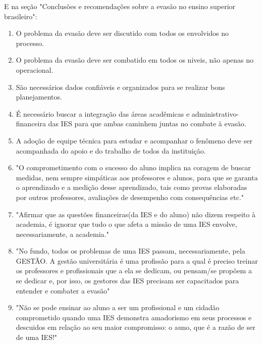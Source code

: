 \documentclass{report}
\begin{document}
E na seção "Conclusões e recomendações sobre a evasão no ensino superior brasileiro":

\begin{enumerate}

\item O problema da evasão deve ser discutido com todos os envolvidos no processo.

\item O problema da evasão deve ser combatido em todos os niveis, não apenas no operacional.

\item São necessários dados confiáveis e organizados para se realizar bons planejamentos.

\item É necessário buscar a integração das áreas acadêmicas e administrativo-financeira das IES para que ambas caminhem juntas no combate à evasão.

\item A adoção de equipe técnica para estudar e acompanhar o fenômeno deve ser acompanhada do apoio e do trabalho de todos da instituição.

\item "O comprometimento com o sucesso do aluno implica na coragem de buscar medidas, nem sempre simpáticas aos professores e alunos, para que se garanta o aprendizado e a medição desse aprendizado, tais como provas elaboradas por outros professores, avaliações de desempenho com consequências etc."

\item "Afirmar que as questões financeiras(da IES e do aluno) não dizem respeito à academia, é ignorar que tudo o que afeta a missão de uma IES envolve, necessariamente, a academia."

\item "No fundo, todos os problemas de uma IES passam, necessariamente, pela GESTÃO. A gestão universitária é uma profissão para a qual é preciso treinar os professores e profissionais que a ela se dedicam, ou pensam/se propõem a se dedicar e, por isso, os gestores das IES precisam ser capacitados para entender e combater a evasão"

\item "Não se pode ensinar ao aluno a ser um profissional e um cidadão comprometido quando uma IES demonstra amadorismo em seus processos e descuidos em relação ao seu maior compromisso: o auno, que é a razão de ser de uma IES!"

\end{enumerate}
\end{document}
